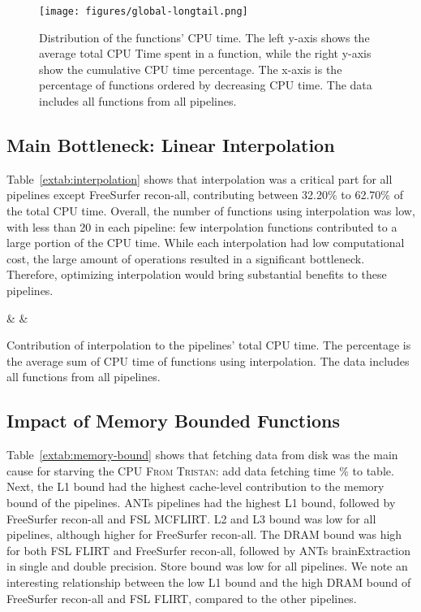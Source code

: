 \documentclass[conference]{IEEEtran}
\newcommand{\TG}[1]{\color{blue}\textsc{From Tristan: }#1\color{black}}
\begin{document}
\begin{figure}[ht]
	\centering
	\texttt{[image: figures/global-longtail.png]}
	\caption{Distribution of the functions' CPU time. The left y-axis shows the average total CPU Time spent in a function, while the right y-axis show the cumulative CPU time percentage. The x-axis is the percentage of functions ordered by decreasing CPU time. The data includes all functions from all pipelines. }
	\label{fig:long-tail-distribution}
\end{figure}

\subsection{Main Bottleneck: Linear Interpolation}
Table~\ref{extab:interpolation} shows that interpolation was a critical part for all pipelines except FreeSurfer recon-all, contributing between 32.20\% to 62.70\% of the total CPU time. Overall, the number of functions using interpolation was low, with less than 20 in each pipeline: few interpolation functions contributed to a large portion of the CPU time. While each interpolation had low computational cost, the large amount of operations resulted in a significant bottleneck. Therefore, optimizing interpolation would bring substantial benefits to these pipelines.

\begin{table}[ht]
	\centering
	{\pipeline & \nfunc & \tablenum[round-precision=2]{\cputime}}
	\caption{Contribution of interpolation to the pipelines' total CPU time. The percentage is the average sum of CPU time of functions using interpolation. The data includes all functions from all pipelines.}
	\label{extab:interpolation}
\end{table}



\subsection{Impact of Memory Bounded Functions}
Table~\ref{extab:memory-bound} shows that fetching data from disk was the main cause for starving the CPU \TG{add data fetching time \% to table}. Next, the L1 bound had the highest cache-level contribution to the memory bound of the pipelines. ANTs pipelines had the highest L1 bound, followed by FreeSurfer recon-all and FSL MCFLIRT. L2 and L3 bound was low for all pipelines, although higher for FreeSurfer recon-all. The DRAM bound was high for both FSL FLIRT and FreeSurfer recon-all, followed by ANTs brainExtraction in single and double precision. Store bound was low for all pipelines. We note an interesting relationship between the low L1 bound and the high DRAM bound of FreeSurfer recon-all and FSL FLIRT, compared to the other pipelines.
\end{document}
